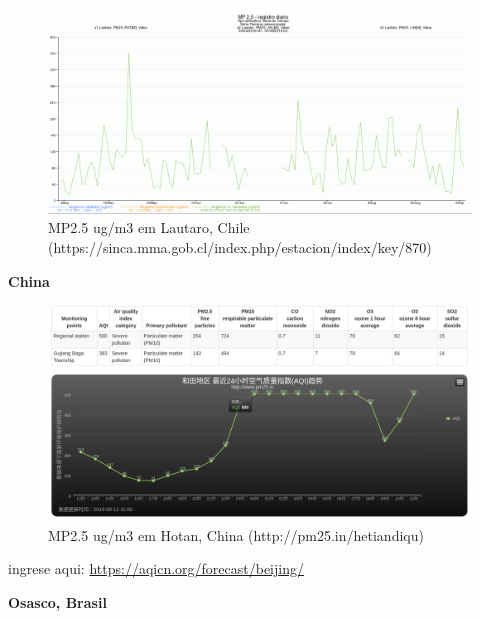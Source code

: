 \documentclass[]{book}
\begin{document}
\begin{figure}
\includegraphics[width=23.32in]{figs/chile1} \caption{MP2.5 ug/m3 em Lautaro, Chile (https://sinca.mma.gob.cl/index.php/estacion/index/key/870)}\label{fig:unnamed-chunk-12}
\end{figure}

\textbf{China}

\begin{figure}
\includegraphics[width=1.5\linewidth]{figs/hotan} \caption{MP2.5 ug/m3 em Hotan, China (http://pm25.in/hetiandiqu)}\label{fig:unnamed-chunk-13}
\end{figure}

ingrese aqui: \url{https://aqicn.org/forecast/beijing/}

\textbf{Osasco, Brasil}
\end{document}
